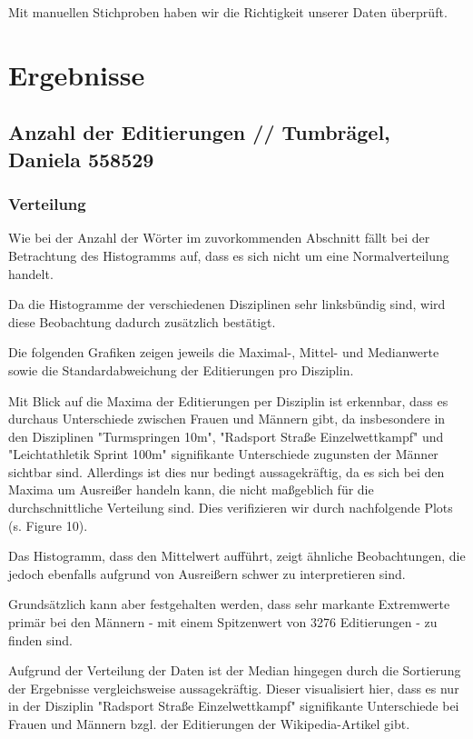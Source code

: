 \documentclass[11pt]{article}
\begin{document}
Mit manuellen Stichproben haben wir die Richtigkeit unserer Daten überprüft.

\section {Ergebnisse}
\subsection{Anzahl der Editierungen // Tumbrägel, Daniela 558529}
\subsubsection{Verteilung}
Wie bei der Anzahl der Wörter im zuvorkommenden Abschnitt fällt bei der Betrachtung des Histogramms auf, dass es sich nicht um eine Normalverteilung handelt.

Da die Histogramme der verschiedenen Disziplinen sehr linksbündig sind, wird diese Beobachtung dadurch zusätzlich bestätigt. 

Die folgenden Grafiken zeigen jeweils die Maximal-, Mittel- und Medianwerte sowie die Standardabweichung der Editierungen pro Disziplin. 

Mit Blick auf die Maxima der Editierungen per Disziplin ist erkennbar, dass es durchaus Unterschiede zwischen Frauen und Männern gibt, da insbesondere in den Disziplinen "Turmspringen 10m", "Radsport Straße Einzelwettkampf" und "Leichtathletik Sprint 100m" signifikante Unterschiede zugunsten der Männer sichtbar sind. Allerdings ist dies nur bedingt aussagekräftig, da es sich bei den Maxima um Ausreißer handeln kann, die nicht maßgeblich für die durchschnittliche Verteilung sind. Dies verifizieren wir durch nachfolgende Plots (s. Figure 10).

Das Histogramm, dass den Mittelwert aufführt, zeigt ähnliche Beobachtungen, die jedoch ebenfalls aufgrund von Ausreißern schwer zu interpretieren sind.

Grundsätzlich kann aber festgehalten werden, dass sehr markante Extremwerte primär bei den Männern - mit einem Spitzenwert von 3276 Editierungen - zu finden sind.

Aufgrund der Verteilung der Daten ist der Median hingegen durch die Sortierung der Ergebnisse vergleichsweise aussagekräftig. Dieser visualisiert hier, dass es nur in der Disziplin "Radsport Straße Einzelwettkampf" signifikante Unterschiede bei Frauen und Männern bzgl. der Editierungen der Wikipedia-Artikel gibt.
\end{document}
